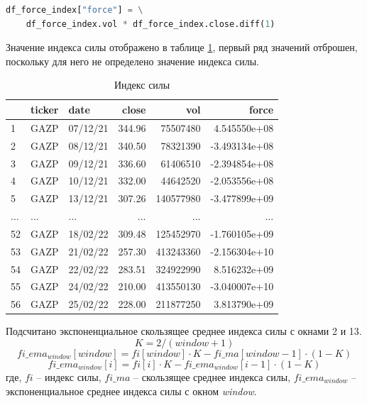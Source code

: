 \documentclass[14pt,a4paper]{extarticle}%
\begin{document}
\begin{lstlisting}[basicstyle=\small, language=Python]
  df_force_index["force"] = \
    df_force_index.vol * df_force_index.close.diff(1)
\end{lstlisting}

Значение индекса силы отображено в таблице \ref{table:data_per_day_FI},
первый ряд значений отброшен, поскольку для него не определено значение индекса силы.

\begin{table}[H]
  \centering
  \begin{tabular}{lllrrr}
    \toprule
    {} & ticker &      date &   close &        vol &         force \\
    \midrule
    1 &   GAZP &  07/12/21 &  344.96 &   75507480 &  4.545550e+08 \\
    2 &   GAZP &  08/12/21 &  340.50 &   78321390 & -3.493134e+08 \\
    3 &   GAZP &  09/12/21 &  336.60 &   61406510 & -2.394854e+08 \\
    4 &   GAZP &  10/12/21 &  332.00 &   44642520 & -2.053556e+08 \\
    5 &   GAZP &  13/12/21 &  307.26 &  140577980 & -3.477899e+09 \\
    ... &   ... &  ... &  ... &  ... & ... \\
    52 &   GAZP &  18/02/22 &  309.48 &  125452970 & -1.760105e+09 \\
    53 &   GAZP &  21/02/22 &  257.30 &  413243360 & -2.156304e+10 \\
    54 &   GAZP &  22/02/22 &  283.51 &  324922990 &  8.516232e+09 \\
    55 &   GAZP &  24/02/22 &  210.00 &  413550130 & -3.040007e+10 \\
    56 &   GAZP &  25/02/22 &  228.00 &  211877250 &  3.813790e+09 \\
    \bottomrule
  \end{tabular}
  \caption{Индекс силы}
  \label{table:data_per_day_FI}
\end{table}

Подсчитано экспоненциальное скользящее среднее индекса силы с окнами 2 и 13.
\[ K = 2 / (window + 1) \]
\[ fi\_ema_{window}[window] = fi[window] \cdot K - fi\_ma[window - 1] \cdot (1 - K) \]
\[ fi\_ema_{window}[i] = fi[i] \cdot K - fi\_ema_{window}[i - 1] \cdot (1 - K) \]
где, $fi$ -- индекс силы, $fi\_ma$ -- скользящее среднее индекса силы,
$fi\_ema_{window}$ -- экспоненциальное среднее индекса силы с окном \textit{window}.
\end{document}
